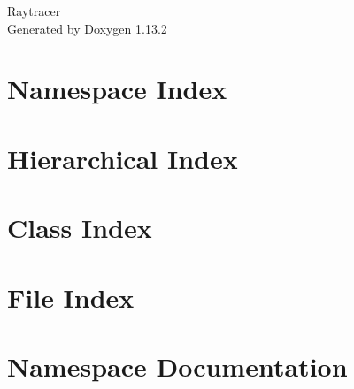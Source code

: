 \documentclass[twoside]{book}
\newcommand{\+}{\discretionary{\mbox{\scriptsize$\hookleftarrow$}}{}{}}
\newcommand{\clearemptydoublepage}{%
    \newpage{\pagestyle{empty}\cleardoublepage}%
  }
\begin{document}
  \raggedbottom
    \hypersetup{pageanchor=false,
                bookmarksnumbered=true,
                pdfencoding=unicode
               }
  \begin{titlepage}
  \vspace*{7cm}
  \begin{center}%
  {\Large Raytracer}\\
  \vspace*{1cm}
  {\large Generated by Doxygen 1.13.2}\\
  \end{center}
  \end{titlepage}
  \clearemptydoublepage
  \tableofcontents
  \clearemptydoublepage
  \hypersetup{pageanchor=true}
\chapter{Namespace Index}

\chapter{Hierarchical Index}

\chapter{Class Index}

\chapter{File Index}

\chapter{Namespace Documentation}


\end{document}
